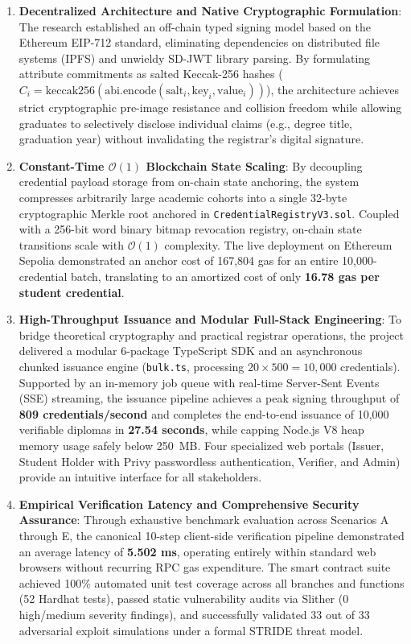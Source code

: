 \begin{enumerate}
    \item \textbf{Decentralized Architecture and Native Cryptographic Formulation}:
    The research established an off-chain typed signing model based on the Ethereum EIP-712 standard, eliminating dependencies on distributed file systems (IPFS) and unwieldy SD-JWT library parsing. By formulating attribute commitments as salted Keccak-256 hashes ($C_i = \text{keccak256}(\text{abi.encode}(\text{salt}_i, \text{key}_i, \text{value}_i))$), the architecture achieves strict cryptographic pre-image resistance and collision freedom while allowing graduates to selectively disclose individual claims (e.g., degree title, graduation year) without invalidating the registrar's digital signature.

    \item \textbf{Constant-Time $\mathcal{O}(1)$ Blockchain State Scaling}:
    By decoupling credential payload storage from on-chain state anchoring, the system compresses arbitrarily large academic cohorts into a single 32-byte cryptographic Merkle root anchored in \texttt{CredentialRegistryV3.sol}. Coupled with a 256-bit word binary bitmap revocation registry, on-chain state transitions scale with $\mathcal{O}(1)$ complexity. The live deployment on Ethereum Sepolia demonstrated an anchor cost of 167,804 gas for an entire 10,000-credential batch, translating to an amortized cost of only \textbf{16.78 gas per student credential}.

    \item \textbf{High-Throughput Issuance and Modular Full-Stack Engineering}:
    To bridge theoretical cryptography and practical registrar operations, the project delivered a modular 6-package TypeScript SDK and an asynchronous chunked issuance engine (\texttt{bulk.ts}, processing $20 \times 500 = 10,000$ credentials). Supported by an in-memory job queue with real-time Server-Sent Events (SSE) streaming, the issuance pipeline achieves a peak signing throughput of \textbf{809 credentials/second} and completes the end-to-end issuance of 10,000 verifiable diplomas in \textbf{27.54 seconds}, while capping Node.js V8 heap memory usage safely below 250~MB. Four specialized web portals (Issuer, Student Holder with Privy passwordless authentication, Verifier, and Admin) provide an intuitive interface for all stakeholders.

    \item \textbf{Empirical Verification Latency and Comprehensive Security Assurance}:
    Through exhaustive benchmark evaluation across Scenarios A through E, the canonical 10-step client-side verification pipeline demonstrated an average latency of \textbf{5.502 ms}, operating entirely within standard web browsers without recurring RPC gas expenditure. The smart contract suite achieved 100\% automated unit test coverage across all branches and functions (52 Hardhat tests), passed static vulnerability audits via Slither (0 high/medium severity findings), and successfully validated 33 out of 33 adversarial exploit simulations under a formal STRIDE threat model.
\end{enumerate}

